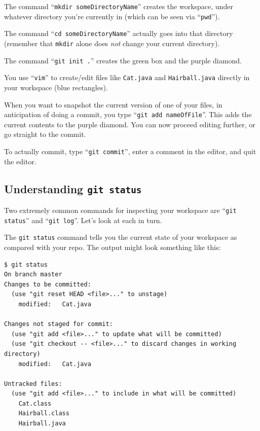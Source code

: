 \begin{compactenum}
\item The command ``\texttt{mkdir someDirectoryName}'' creates the workspace,
under whatever directory you're currently in (which can be seen via
``\texttt{pwd}'').
\item The command ``\texttt{cd someDirectoryName}'' actually goes into that
directory (remember that \texttt{mkdir} alone does \textit{not} change your
current directory).
\item The command ``\texttt{git init .}'' creates the green box and the purple
diamond.
\item You use ``\texttt{vim}'' to create/edit files like \texttt{Cat.java} and
\texttt{Hairball.java} directly in your workspace (blue rectangles).
\item When you want to snapshot the current version of one of your files, in
anticipation of doing a commit, you type ``\texttt{git add nameOfFile}''. This
adds the current contents to the purple diamond. You can now proceed editing
further, or go straight to the commit.
\item To actually commit, type ``\texttt{git commit}'', enter a comment in the
editor, and quit the editor.
\end{compactenum}

\subsection{Understanding \texttt{git status}}

Two extremely common commands for inspecting your workspace are ``\texttt{git
status}'' and ``\texttt{git log}''. Let's look at each in turn.

The \texttt{git status} command tells you the current state of your workspace
as compared with your repo. The output might look something like this:

\begin{Verbatim}[fontsize=\footnotesize,samepage=true,frame=single]
$ git status
On branch master
Changes to be committed:
  (use "git reset HEAD <file>..." to unstage)
    modified:   Cat.java

Changes not staged for commit:
  (use "git add <file>..." to update what will be committed)
  (use "git checkout -- <file>..." to discard changes in working directory)
    modified:   Cat.java

Untracked files:
  (use "git add <file>..." to include in what will be committed)
    Cat.class
    Hairball.class
    Hairball.java
\end{Verbatim}

